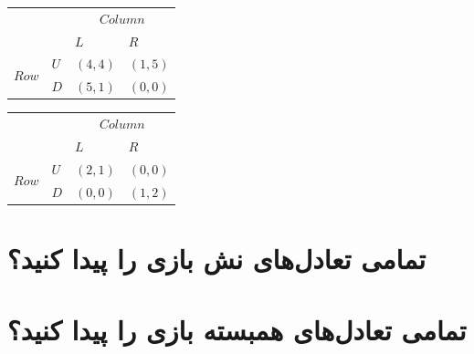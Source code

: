 \documentclass[12pt]{exam}
\theoremstyle{plain}
\theoremstyle{definition}
\theoremstyle{remark}
\begin{document}
\begin{questions}
{ \centering
    \begin{LTR}
        \begin{tabular}{l|l|l|l}
            \multicolumn{2}{l}{\multirow{2}{*}{}}                                               & \multicolumn{2}{c}{$Column$}                              \\ \cline{3-4} 
            \multicolumn{2}{l}{}                                                                & \multicolumn{1}{|l|}{$L$}    & \multicolumn{1}{l|}{$R$}    \\ \cline{2-4} 
            \multicolumn{1}{c|}{\multirow{2}{*}{$Row$}} & \multicolumn{1}{l|}{$U$} & \multicolumn{1}{l|}{$(4,4)$} & \multicolumn{1}{l|}{$(1,5)$} \\ \cline{2-4} 
            \multicolumn{1}{c|}{}                                     & \multicolumn{1}{l|}{$D$} & \multicolumn{1}{l|}{$(5,1)$} & \multicolumn{1}{l|}{$(0,0)$} \\ \cline{2-4} 
        \end{tabular}
        \begin{tabular}{l|l|l|l}
            \multicolumn{2}{l}{\multirow{2}{*}{}}                                               & \multicolumn{2}{c}{$Column$}                              \\ \cline{3-4} 
            \multicolumn{2}{l}{}                                                                & \multicolumn{1}{|l|}{$L$}    & \multicolumn{1}{l|}{$R$}    \\ \cline{2-4} 
            \multicolumn{1}{c|}{\multirow{2}{*}{$Row$}} & \multicolumn{1}{l|}{$U$} & \multicolumn{1}{l|}{$(2,1)$} & \multicolumn{1}{l|}{$(0,0)$} \\ \cline{2-4} 
            \multicolumn{1}{c|}{}                                     & \multicolumn{1}{l|}{$D$} & \multicolumn{1}{l|}{$(0,0)$} & \multicolumn{1}{l|}{$(1,2)$} \\ \cline{2-4} 
        \end{tabular}
    \end{LTR}
}

\begin{parts}
    \part{
        تمامی تعادل‌های نش بازی را پیدا کنید؟
    }
    \part{
        تمامی تعادل‌های همبسته بازی را پیدا کنید؟
    }
\end{parts}


\end{questions}
\end{document}
